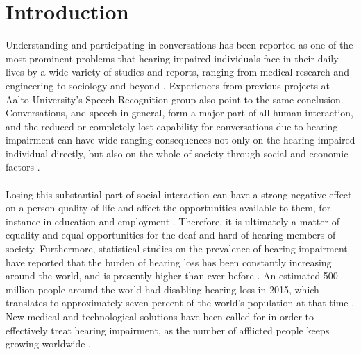\documentclass[english, 12pt, a4paper, pdftex, elec, utf8]{aaltothesis}
\begin{document}

\cleardoublepage
\storeinipagenumber
{}
\setcounter{page}{1}

\section{Introduction}

Understanding and participating in conversations has been reported as one of the most prominent problems that hearing impaired individuals face in their daily lives by a wide variety of studies and reports, ranging from medical research and engineering to sociology and beyond \cite{moore2007cochlear, peterson2010cochlear, wilson2017global, ohlenforst2017effects, stacey2006hearing, hietala2008huonokuuloinen, healy2016difficulty, koskela2013kuulokojeen, lavikainen2014, blomberg2012sisakorvaistutetta, haatainen2013viestintahaasteet}. Experiences from previous projects at Aalto University's Speech Recognition group also point to the same conclusion. Conversations, and speech in general, form a major part of all human interaction, and the reduced or completely lost capability for conversations due to hearing impairment can have wide-ranging consequences not only on the hearing impaired individual directly, but also on the whole of society through social and economic factors \cite{koskela2013kuulokojeen, stacey2006hearing}. \\\\
Losing this substantial part of social interaction can have a strong negative effect on a person quality of life and affect the opportunities available to them, for instance in education and employment \cite{hietala2008huonokuuloinen, lavikainen2014}. Therefore, it is ultimately a matter of equality and equal opportunities for the deaf and hard of hearing members of society. Furthermore, statistical studies on the prevalence of hearing impairment have reported that the burden of hearing loss has been constantly increasing around the world, and is presently higher than ever before \cite{mathers2000global, wilson2017global}. An estimated 500 million people around the world had disabling hearing loss in 2015, which translates to approximately seven percent of the world’s population at that time \cite{wilson2017global}. New medical and technological solutions have been called for in order to effectively treat hearing impairment, as the number of afflicted people keeps growing worldwide \cite{wilson2017global}. \\\\
\end{document}
